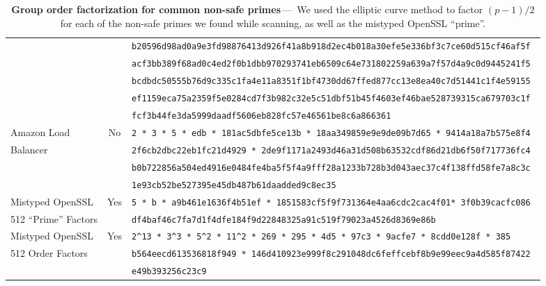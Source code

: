 {\begin{landscape}
\begin{table*}[ht]
\begin{tabularx}{\linewidth}{lcl}
                              &   & \tt b20596d98ad0a9e3fd98876413d926f41a8b918d2ec4b018a30efe5e336bf3c7ce60d515cf46af5f \\
                              &   & \tt acf3bb389f68ad0c4ed2f0b1dbb970293741eb6509c64e731802259a639a7f57d4a9c0d9445241f5 \\
                              &   & \tt bcdbdc50555b76d9c335c1fa4e11a8351f1bf4730dd67ffed877cc13e8ea40c7d51441c1f4e59155 \\
                              &   & \tt ef1159eca75a2359f5e0284cd7f3b982c32e5c51dbf51b45f4603ef46bae528739315ca679703c1f \\
                              &   & \tt fcf3b44fe3da5999daadf5606eb828fc57e46561be8c6a866361 \\
        Amazon Load           & No & \tt 2 * 3 * 5 * edb * 181ac5dbfe5ce13b * 18aa349859e9e9de09b7d65 * 9414a18a7b575e8f4 \\
        Balancer              &   & \tt 2f6cb2dbc22eb1fc21d4929 * 2de9f1171a2493d46a31d508b63532cdf86d21db6f50f717736fc4 \\
                              &   & \tt b0b722856a504ed4916e0484fe4ba5f5f4a9fff28a1233b728b3d043aec37c4f138ffd58fe7a8c3c \\
                              &   & \tt 1e93cb52be527395e45db487b61daadded9c8ec35 \\
        Mistyped OpenSSL      & Yes & \tt 5 * b * a9b461e1636f4b51ef * 1851583cf5f9f731364e4aa6cdc2cac4f01* 3f0b39cacfc086 \\
        512 ``Prime'' Factors &   & \tt df4baf46c7fa7d1f4dfe184f9d22848325a91c519f79023a4526d8369e86b \\
        Mistyped OpenSSL      & Yes & \tt 2\^{}13 * 3\^{}3 * 5\^{}2 * 11\^{}2 * 269 * 295 * 4d5 * 97c3 * 9acfe7 * 8cdd0e128f * 385 \\
        512 Order Factors     &   & \tt b564eecd613536818f949 * 146d410923e999f8c291048dc6feffcebf8b9e99eec9a4d585f87422 \\
                              &   & \tt e49b393256c23c9 \\
        \bottomrule
    \end{tabularx}
    \caption{\textbf{Group order factorization for common non-safe primes}\,---\,%
    We used the elliptic curve method to factor $(p-1)/2$ for each of the
    non-safe primes we found while scanning, as well as the mistyped OpenSSL
    ``prime''.
    }
    \label{tab:group-order-factorization}
\end{table*}
\end{landscape}
}


